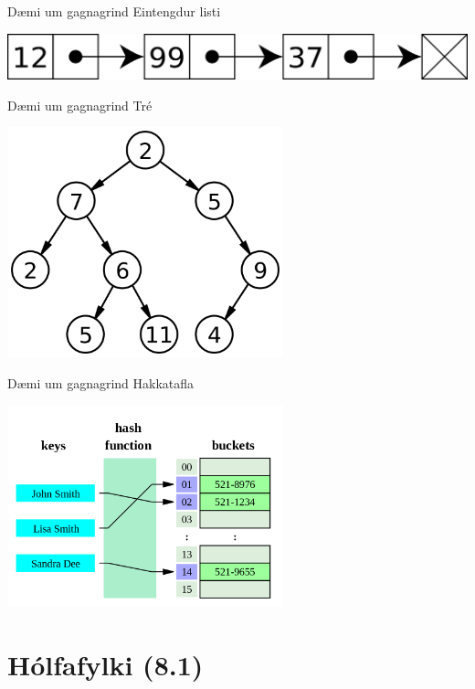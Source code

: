 \documentclass{beamer}
\begin{document}
\begin{frame}{Dæmi um gagnagrind}
Eintengdur listi
\begin{center}
\includegraphics[width=\textwidth]{Pics/singly-linked-list}
\end{center}
\end{frame}

\begin{frame}{Dæmi um gagnagrind}
\vspace{\baselineskip}
Tré
\begin{center}
\includegraphics[width=0.6\textwidth]{Pics/tree}
\end{center}
\end{frame}

\begin{frame}{Dæmi um gagnagrind}
Hakkatafla
\begin{center}
\includegraphics[width=0.6\textwidth]{Pics/hash-table}
\end{center}
\end{frame}

\section{Hólfafylki (8.1)}
\end{document}
